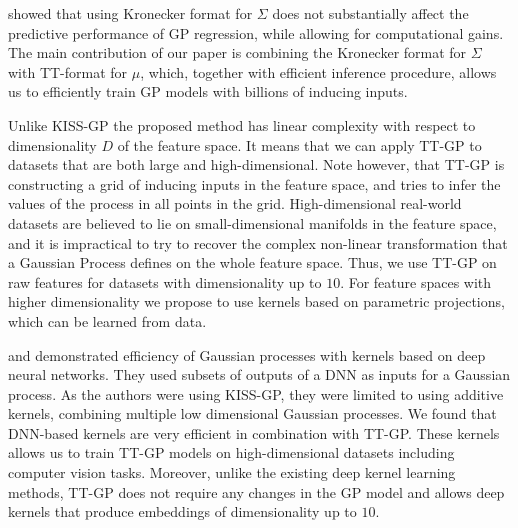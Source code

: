 \citet{nickson2015} showed that using Kronecker
format for $\Sigma$ does not substantially affect the predictive performance
of GP regression, while allowing for computational gains. The main contribution
of our paper is combining the Kronecker format for $\Sigma$ with TT-format
for $\mu$, which, together with efficient inference procedure, allows us to
efficiently train GP models with billions of inducing inputs.

Unlike KISS-GP the proposed method has linear complexity with respect to 
dimensionality $D$ of the feature space. It means that we can apply TT-GP
to datasets that are both large and high-dimensional. Note however, that
TT-GP is constructing a grid of inducing inputs in the feature space, and
tries to infer the values of the process in all points in the grid. 
High-dimensional real-world datasets are believed to lie on small-dimensional
manifolds in the feature space, and it is impractical to try to recover the
complex non-linear transformation that a Gaussian Process defines on the 
whole feature space. Thus, we use TT-GP on raw features for datasets with
dimensionality up to $10$. For feature spaces with higher dimensionality
we propose to use kernels based on parametric projections, which can be learned
from data.
 
\citet{wilson2016deep} and \citet{wilson2016stochastic}
demonstrated efficiency of Gaussian processes with kernels based on deep
neural networks. They used subsets of outputs of a DNN as
inputs for a Gaussian process. As the authors were using KISS-GP, they
were limited to using additive kernels, combining multiple low dimensional 
Gaussian processes. We found that DNN-based kernels are very efficient 
in combination with TT-GP. These kernels allows us to train TT-GP models
on high-dimensional datasets including computer vision tasks. Moreover,
unlike the existing deep kernel learning methods, TT-GP does not require
any changes in the GP model and allows deep kernels that produce embeddings
of dimensionality up to $10$.
